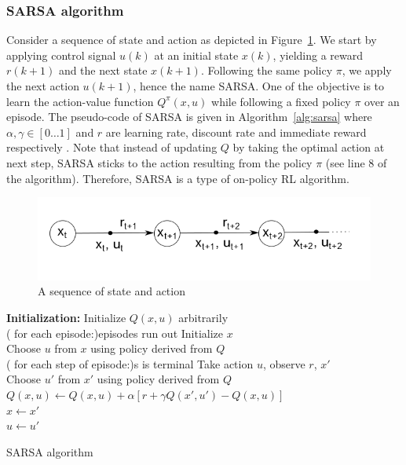 	\subsubsection{\ac{SARSA} algorithm} 
	Consider a sequence of state and action as depicted in Figure~\ref{fig:sarsa}. We start by applying control signal $ u(k) $ at an initial state $ x(k) $, yielding a reward $ r(k+1) $ and the next state $ x(k+1)$. Following the same policy $\pi$, we apply the next action $ u(k+1) $, hence the name \ac {SARSA}. One of the objective is to learn the action-value function $ Q^{\pi}(x,u) $ while following a fixed policy $ \pi $ over an episode. The pseudo-code of \ac{SARSA} is given in Algorithm~\ref{alg:sarsa} where $ \alpha, \gamma \in [0 \dots 1]$ and $r$ are learning rate, discount rate and immediate reward respectively \cite{sutton1998reinforcement}. Note that instead of updating $Q$ by taking the optimal action at next step, \ac {SARSA} sticks to the action resulting from the policy $\pi$ (see line 8 of the algorithm). Therefore, \ac {SARSA} is a type of on-policy \ac {RL} algorithm.
	
	
	\begin{figure}[h!]
		\centering
		\includegraphics[width=0.7\linewidth]{sarsa}
		\caption{A sequence of state and action}
		\label{fig:sarsa}
	\end{figure}
	
	\begin{algorithm}[H]
		\textbf{Initialization:} Initialize $ Q(x,u) $ arbitrarily\\
		\Repeat( for each episode:){episodes run out}{
			Initialize $ x $ \\
			Choose $ u $ from $ x $ using policy derived from $ Q $ \\
			\Repeat ( for each step of episode:){s is terminal}{
				Take action $ u $, observe $ r $, $ x' $ \\
				Choose $ u' $ from $ x' $ using policy derived from $ Q $ \\
				$ Q(x,u) \leftarrow Q(x,u) + \alpha[r+\gamma Q(x',u')-Q(x,u)] $	\\
				$ x \leftarrow  x' $\\
				$ u \leftarrow  u' $
			}
		} 		
		\label{alg:sarsa}
		\caption{SARSA algorithm}
	\end{algorithm}
	
